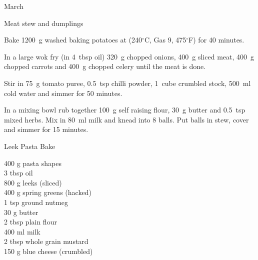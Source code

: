 \begin{menu}{March}
\begin{recipe}{2}{Meat stew and dumplings}
    \begin{instructions}
    \item 
      Bake 
      1200~g washed baking potatoes
      at
      (240$^{\circ}$C, Gas 9, 475$^{\circ}$F) for 40 minutes.
    \item 
        In a large wok fry
        (in 4~tbsp  oil)
        320~g chopped onions,
        400~g sliced meat,
        400~g chopped carrots
        and
        400~g chopped celery
        until the meat is done.
      \item 
        Stir in
        75~g  tomato puree,
        0.5~tsp  chilli powder,
        1~cube crumbled stock,
        500~ml  cold water
        and simmer for 50 minutes.
      \item 
        In a mixing bowl rub together
        100~g  self raising flour,
        30~g  butter
        and
        0.5~tsp  mixed herbs.
        Mix in 
        80~ml  milk
        and knead into 8 balls.
        Put balls in stew, cover and
        simmer for 15 minutes.
      
    \end{instructions}
    \end{recipe}%
  
    \begin{recipe}{2}{Leek Pasta Bake}%
		\begin{ingredients}
		400 g pasta shapes  \\
	3 tbsp oil  \\
	800 g leeks (sliced) \\
	400 g spring greens (hacked) \\
	1 tsp ground nutmeg  \\
	30 g butter  \\
	2 tbsp plain flour  \\
	400 ml milk  \\
	2 tbsp whole grain mustard  \\
	150 g blue cheese (crumbled) \\
	
		\end{ingredients}
	

\end{recipe}
\end{menu}
